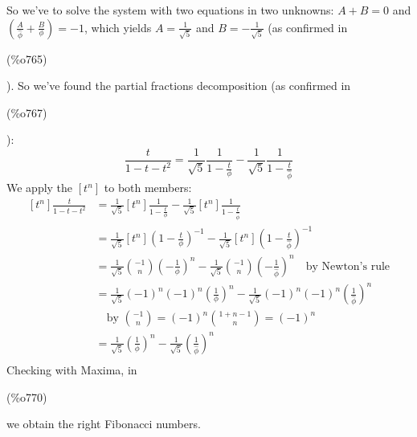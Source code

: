 So we've to solve the system with two equations in two unknowns:
$A+B=0$ and $\left(\frac{A}{\hat{\phi}} +\frac{B}{\phi} \right) = -1$,
which yields $A= \frac{1}{\sqrt{5}} $ and $B= -\frac{1}{\sqrt{5}}$ (as
confirmed in \parbox{8ex}{\color{labelcolor}(\%o765) }). So we've
found the partial fractions decomposition (as confirmed
in \parbox{8ex}{\color{labelcolor}(\%o767) }):
\begin{equation}
  \frac{t}{1-t-t^2} =  \frac{1}{\sqrt{5}}\frac{1}{1-\frac{t}{\phi}}-
  \frac{1}{\sqrt{5}}\frac{1}{1-\frac{t}{\hat{\phi}}}
\end{equation}
We apply the $[t^{n}] $ to both members:
\begin{displaymath}
  \begin{split}
    [t^{n}]\frac{t}{1-t-t^2} &=
    \frac{1}{\sqrt{5}}[t^{n}]\frac{1}{1-\frac{t}{\phi}}-
    \frac{1}{\sqrt{5}}[t^{n}]\frac{1}{1-\frac{t}{\hat{\phi}}}\\
    &= \frac{1}{\sqrt{5}}[t^{n}]\left(1-\frac{t}{\phi}\right)^{-1}-
    \frac{1}{\sqrt{5}}[t^{n}]\left(1-\frac{t}{\hat{\phi}}\right)^{-1}
    \\
    &=
    \frac{1}{\sqrt{5}}{{-1}\choose{n}}\left(-\frac{1}{\phi}\right)^{n}-
    \frac{1}{\sqrt{5}}{{-1}\choose{n}}\left(-\frac{1}{\hat{\phi}}\right)^{n}
    \quad \text{by Newton's rule}\\
    &= \frac{1}{\sqrt{5}}(-1)^n(-1)^n\left(\frac{1}{\phi}\right)^{n}-
    \frac{1}{\sqrt{5}}(-1)^n(-1)^n\left(\frac{1}{\hat{\phi}}\right)^{n}\\
    & \quad \text{by } {{-1}\choose{n}} = (-1)^n{{1+n-1}\choose{n}} =
    (-1)^n\\
    &= \frac{1}{\sqrt{5}}\left(\frac{1}{\phi}\right)^{n}-
    \frac{1}{\sqrt{5}}\left(\frac{1}{\hat{\phi}}\right)^{n}\\
  \end{split}
\end{displaymath}
Checking with Maxima, in \parbox{8ex}{\color{labelcolor}(\%o770) } we
obtain the right Fibonacci numbers.




